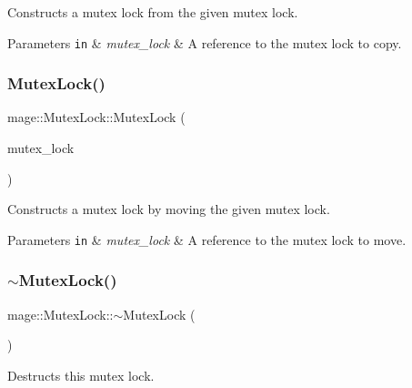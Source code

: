 Constructs a mutex lock from the given mutex lock.


\begin{DoxyParams}[1]{Parameters}
\mbox{\tt in}  & {\em mutex\+\_\+lock} & A reference to the mutex lock to copy. \\
\hline
\end{DoxyParams}
\hypertarget{structmage_1_1_mutex_lock_a5045ffd6d3743b7994ba2ddfaf093a4a}{}\label{structmage_1_1_mutex_lock_a5045ffd6d3743b7994ba2ddfaf093a4a} 
\subsubsection{\texorpdfstring{Mutex\+Lock()}{MutexLock()}\hspace{0.1cm}{\footnotesize\ttfamily [3/3]}}
{\footnotesize\ttfamily mage\+::\+Mutex\+Lock\+::\+Mutex\+Lock (\begin{DoxyParamCaption}\item[{\hyperlink{structmage_1_1_mutex_lock}{Mutex\+Lock} \&\&}]{mutex\+\_\+lock }\end{DoxyParamCaption})\hspace{0.3cm}{\ttfamily [delete]}}

Constructs a mutex lock by moving the given mutex lock.


\begin{DoxyParams}[1]{Parameters}
\mbox{\tt in}  & {\em mutex\+\_\+lock} & A reference to the mutex lock to move. \\
\hline
\end{DoxyParams}
\hypertarget{structmage_1_1_mutex_lock_a2631e8878646b2d25b136b6adb55d553}{}\label{structmage_1_1_mutex_lock_a2631e8878646b2d25b136b6adb55d553} 
\subsubsection{\texorpdfstring{$\sim$\+Mutex\+Lock()}{~MutexLock()}}
{\footnotesize\ttfamily mage\+::\+Mutex\+Lock\+::$\sim$\+Mutex\+Lock (\begin{DoxyParamCaption}{ }\end{DoxyParamCaption})}

Destructs this mutex lock. 

